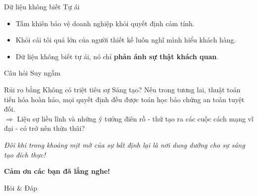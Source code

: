 \documentclass[aspectratio=169]{beamer}
\begin{document}
\begin{frame}{Dữ liệu không biết Tự ái}
    \begin{itemize}
        \item Tấm khiên bảo vệ doanh nghiệp khỏi quyết định cảm tính.
        \item Khỏi cái tôi quá lớn của người thiết kế luôn nghĩ mình hiểu khách hàng.
        \item Dữ liệu không biết tự ái, nó chỉ \textbf{phản ánh sự thật khách quan}.
    \end{itemize}
\end{frame}

\begin{frame}{Câu hỏi Suy ngẫm}
    \begin{block}{Rủi ro bằng Không có triệt tiêu sự Sáng tạo?}
        Nếu trong tương lai, thuật toán tiến hóa hoàn hảo, mọi quyết định đều được toán học bảo chứng an toàn tuyệt đối. \\
        $\Rightarrow$ Liệu sự liều lĩnh và những ý tưởng điên rồ - thứ tạo ra các cuộc cách mạng vĩ đại - có trở nên thừa thãi?
    \end{block}
    \vspace{0.3cm}
    \textit{Đôi khi trong khoảng mịt mờ của sự bất định lại là nơi dung dưỡng cho sự sáng tạo đích thực!}
\end{frame}

\begin{frame}
    \centering
    \Huge \textbf{Cảm ơn các bạn đã lắng nghe!}
    
    \vspace{0.5cm}
    \Large Hỏi \& Đáp
\end{frame}
\end{document}
